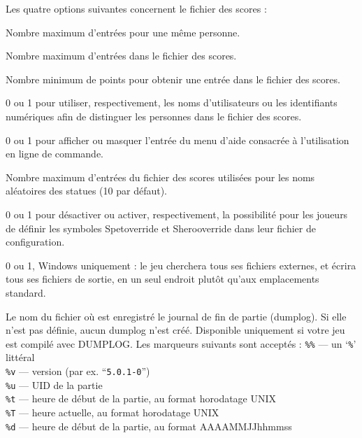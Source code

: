 \documentclass[titlepage]{article}
\begin{document}
Les quatre options suivantes concernent le fichier des scores :
\begin{description}[font=\mdseries\itshape]
\item[PERSMAX]
Nombre maximum d'entrées pour une même personne.
\item[ENTRYMAX]
Nombre maximum d'entrées dans le fichier des scores.
\item[POINTSMIN]
Nombre minimum de points pour obtenir une entrée dans le fichier des scores.
\item[PERS\textunderscore IS\textunderscore UID]
0 ou 1 pour utiliser, respectivement, les noms d'utilisateurs ou les identifiants
numériques afin de distinguer les personnes dans le fichier des scores.
\item[HIDEUSAGE]
0 ou 1 pour afficher ou masquer l'entrée du menu d'aide consacrée
à l'utilisation en ligne de commande.
\item[MAX\textunderscore STATUENAME\textunderscore RANK]
Nombre maximum d'entrées du fichier des scores utilisées pour
les noms aléatoires des statues (10 par défaut).
\item[ACCESSIBILITY]
0 ou 1 pour désactiver ou activer, respectivement, la possibilité pour les joueurs
de définir les symboles S\textunderscore pet\textunderscore override et S\textunderscore hero\textunderscore override
dans leur fichier de configuration.
\item[PORTABLE\textunderscore DEVICE\textunderscore PATHS]
0 ou 1, Windows uniquement : le jeu cherchera tous ses fichiers
externes, et écrira tous ses fichiers de sortie, en un seul endroit
plutôt qu'aux emplacements standard.
\item[DUMPLOGFILE]
Le nom du fichier où est enregistré le journal de fin de partie (dumplog).
Si elle n'est pas définie, aucun dumplog n'est créé.
Disponible uniquement si votre jeu est compilé avec DUMPLOG.
Les marqueurs suivants sont acceptés :
\texttt{\%\%}  --- un `\texttt{\%}' littéral\\
\texttt{\%v}  --- version (par ex. ``\texttt{5.0.1-0}'')\\
\texttt{\%u}  --- UID de la partie\\
\texttt{\%t}  --- heure de début de la partie, au format horodatage UNIX\\
\texttt{\%T}  --- heure actuelle, au format horodatage UNIX\\
\texttt{\%d}  --- heure de début de la partie, au format AAAAMMJJhhmmss\\

\end{description}
\end{document}
